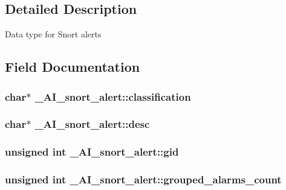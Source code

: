 \subsection{Detailed Description}
Data type for Snort alerts 

\subsection{Field Documentation}
\hypertarget{struct__AI__snort__alert_aa89585e14acb2c4e684a1552d322632f}{
\subsubsection[{classification}]{\setlength{\rightskip}{0pt plus 5cm}char$\ast$ {\bf \_\-AI\_\-snort\_\-alert::classification}}}
\label{struct__AI__snort__alert_aa89585e14acb2c4e684a1552d322632f}
\hypertarget{struct__AI__snort__alert_ac0902d7c756ec675fb06347ce4706135}{
\subsubsection[{desc}]{\setlength{\rightskip}{0pt plus 5cm}char$\ast$ {\bf \_\-AI\_\-snort\_\-alert::desc}}}
\label{struct__AI__snort__alert_ac0902d7c756ec675fb06347ce4706135}
\hypertarget{struct__AI__snort__alert_af8408be5da59cda853442dd13465c0f6}{
\subsubsection[{gid}]{\setlength{\rightskip}{0pt plus 5cm}unsigned int {\bf \_\-AI\_\-snort\_\-alert::gid}}}
\label{struct__AI__snort__alert_af8408be5da59cda853442dd13465c0f6}
\hypertarget{struct__AI__snort__alert_a285aff12d6bac03c316ccc5305d28e53}{
\subsubsection[{grouped\_\-alarms\_\-count}]{\setlength{\rightskip}{0pt plus 5cm}unsigned int {\bf \_\-AI\_\-snort\_\-alert::grouped\_\-alarms\_\-count}}}
